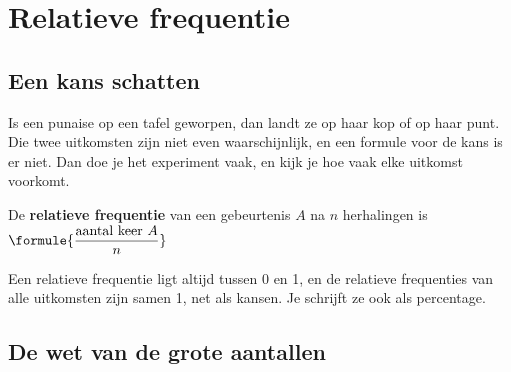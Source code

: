 \begin{oefeningen}
\end{oefeningen}

\section{Relatieve frequentie}

\subsection{Een kans schatten}

Is een punaise op een tafel geworpen, dan landt ze op haar kop of op haar punt. Die twee uitkomsten zijn niet even waarschijnlijk, en een formule voor de kans is er niet. Dan doe je het experiment vaak, en kijk je hoe vaak elke uitkomst voorkomt.

\begin{theorie}
De \textbf{\textcolor{accent}{relatieve frequentie}} van een gebeurtenis $A$ na $n$ herhalingen is \quad $\formule{\dfrac{\text{aantal keer } A}{n}}$
\end{theorie}

Een relatieve frequentie ligt altijd tussen 0 en 1, en de relatieve frequenties van alle uitkomsten zijn samen 1, net als kansen. Je schrijft ze ook als percentage.


\begin{oefeningen}

\end{oefeningen}

\subsection{De wet van de grote aantallen}

